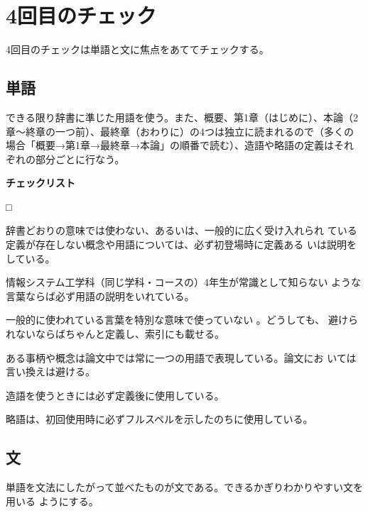 \documentclass[11pt,a4j]{jsarticle}
\begin{document}
\section{4回目のチェック}

4回目のチェックは単語と文に焦点をあててチェックする。

\subsection{単語}

できる限り辞書に準じた用語を使う。また、概要、第1章（はじめに）、本論（2
章〜終章の一つ前）、最終章（おわりに）の4つは独立に読まれるので（多くの
場合「概要→第1章→最終章→本論」の順番で読む）、造語や略語の定義はそれ
ぞれの部分ごとに行なう。

\begin{flushleft}
 {\bf チェックリスト}
\end{flushleft}
\begin{list}%
 {□} %
 {} %
 \item 辞書どおりの意味では使わない、あるいは、一般的に広く受け入れられ
       ている定義が存在しない概念や用語については、必ず初登場時に定義ある
       いは説明をしている。
 \item 情報システム工学科（同じ学科・コースの）4年生が常識として知らない
       ような言葉ならば必ず用語の説明をいれている。
 \item 一般的に使われている言葉を特別な意味で使っていない 。どうしても、
       避けられないならばちゃんと定義し、索引にも載せる。
 \item ある事柄や概念は論文中では常に一つの用語で表現している。論文にお
       いては言い換えは避ける。
 \item 造語を使うときには必ず定義後に使用している。
 \item 略語は、初回使用時に必ずフルスペルを示したのちに使用している。
 \end{list}

\subsection{文}

単語を文法にしたがって並べたものが文である。できるかぎりわかりやすい文を用いる
ようにする。
\end{document}
